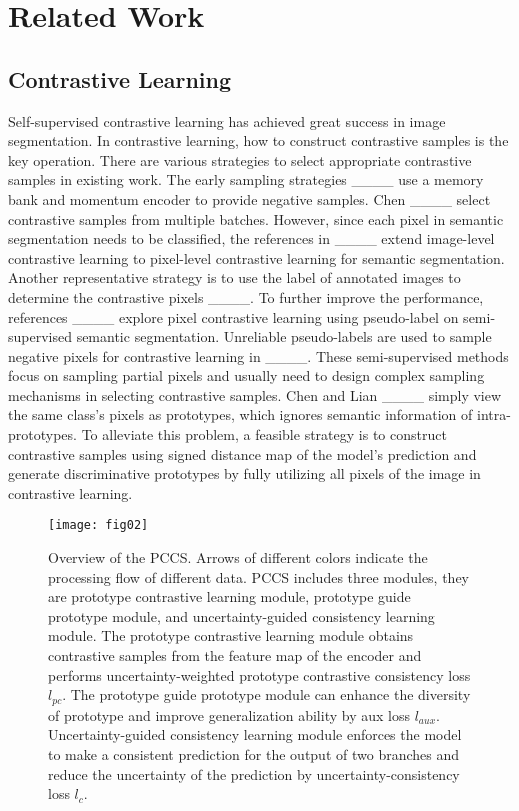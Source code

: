 \section{Related Work}
\label{sec:related work}
\subsection{Contrastive Learning}
Self-supervised contrastive learning has achieved great success in image segmentation.  In contrastive learning, how to construct contrastive samples is the key operation. There are various strategies to select appropriate contrastive samples in existing work. The early sampling strategies ____ use a memory bank and momentum encoder to provide negative samples. Chen ____ select contrastive samples from multiple batches. However, since each pixel in semantic segmentation needs to be classified, the references in ____ extend image-level contrastive learning to pixel-level contrastive learning for semantic segmentation. Another representative strategy is to use the label of annotated images to determine the contrastive pixels ____. 
To further improve the performance, references ____ explore pixel contrastive learning using pseudo-label on semi-supervised semantic segmentation. Unreliable pseudo-labels are used to sample negative pixels for contrastive learning in ____. These semi-supervised methods focus on sampling partial pixels and usually need to design complex sampling mechanisms in selecting contrastive samples. Chen and Lian ____ simply view the same class's pixels as prototypes, which ignores semantic information of intra-prototypes. To alleviate this problem, a feasible strategy is to construct contrastive samples using signed distance map of the model's prediction and generate discriminative prototypes by fully utilizing all pixels of the image in contrastive learning.

\begin{figure*}[htbp]
	\centerline{\texttt{[image: fig02]}}
	\caption{Overview of the PCCS. Arrows of different colors indicate the processing flow of different data. PCCS includes three modules, they are prototype contrastive learning module, prototype guide prototype module, and uncertainty-guided consistency learning module. The prototype contrastive learning module obtains contrastive samples from the feature map of the encoder and performs uncertainty-weighted prototype contrastive consistency loss {$l_{pc}$}. The prototype guide prototype module can enhance the diversity of prototype and improve generalization ability by aux loss {$l_{aux}$}. 
		Uncertainty-guided consistency learning module enforces the model to make a consistent prediction for the output of two branches and reduce the uncertainty of the prediction by  uncertainty-consistency loss {$l_{c}$}.}
	\label{fig:main_arch}
\end{figure*}

